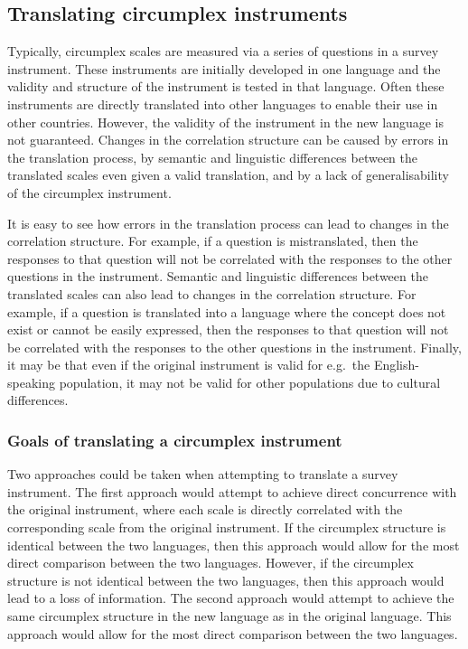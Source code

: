 \documentclass[
  default,
]{sn-jnl}
\begin{document}
\subsection{Translating circumplex
instruments}\label{translating-circumplex-instruments}

Typically, circumplex scales are measured via a series of questions in a
survey instrument. These instruments are initially developed in one
language and the validity and structure of the instrument is tested in
that language. Often these instruments are directly translated into
other languages to enable their use in other countries. However, the
validity of the instrument in the new language is not guaranteed.
Changes in the correlation structure can be caused by errors in the
translation process, by semantic and linguistic differences between the
translated scales even given a valid translation, and by a lack of
generalisability of the circumplex instrument.

It is easy to see how errors in the translation process can lead to
changes in the correlation structure. For example, if a question is
mistranslated, then the responses to that question will not be
correlated with the responses to the other questions in the instrument.
Semantic and linguistic differences between the translated scales can
also lead to changes in the correlation structure. For example, if a
question is translated into a language where the concept does not exist
or cannot be easily expressed, then the responses to that question will
not be correlated with the responses to the other questions in the
instrument. Finally, it may be that even if the original instrument is
valid for e.g.~the English-speaking population, it may not be valid for
other populations due to cultural differences.

\subsubsection{Goals of translating a circumplex
instrument}\label{goals-of-translating-a-circumplex-instrument}

Two approaches could be taken when attempting to translate a survey
instrument. The first approach would attempt to achieve direct
concurrence with the original instrument, where each scale is directly
correlated with the corresponding scale from the original instrument. If
the circumplex structure is identical between the two languages, then
this approach would allow for the most direct comparison between the two
languages. However, if the circumplex structure is not identical between
the two languages, then this approach would lead to a loss of
information. The second approach would attempt to achieve the same
circumplex structure in the new language as in the original language.
This approach would allow for the most direct comparison between the two
languages.
\end{document}
